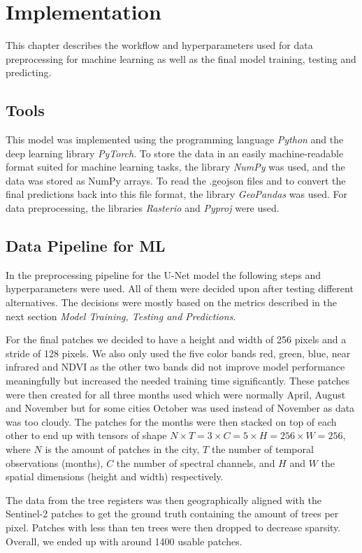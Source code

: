 \section{Implementation}
This chapter describes the workflow and hyperparameters used for data preprocessing for machine learning as well as the final model training, testing and predicting.

\subsection{Tools}
This model was implemented using the programming language \textit{Python} and the deep learning library \textit{PyTorch}. To store the data in an easily machine-readable format suited for machine learning tasks, the library \textit{NumPy} was used, and the data was stored as NumPy arrays. To read the .geojson files and to convert the final predictions back into this file format, the library \textit{GeoPandas} was used. For data preprocessing, the libraries \textit{Rasterio} and \textit{Pyproj} were used. 

\subsection{Data Pipeline for ML}
In the preprocessing pipeline for the U-Net model the following steps and hyperparameters were used. All of them were decided upon after testing different alternatives. The decisions were mostly based on the metrics described in the next section \textit{Model Training, Testing and Predictions}.

For the final patches we decided to have a height and width of 256 pixels and a stride of 128 pixels. We also only used the five color bands red, green, blue, near infrared and NDVI as the other two bands did not improve model performance meaningfully but increased the needed training time significantly. These patches were then created for all three months used which were normally April, August and November but for some cities October was used instead of November as data was too cloudy. The patches for the months were then stacked on top of each other to end up with tensors of shape $N \times T=3 \times C=5 \times H=256 \times W=256$, where $N$ is the amount of patches in the city, $T$ the number of temporal observations (months), $C$ the number of spectral channels, and $H$ and $W$ the spatial dimensions (height and width) respectively.

The data from the tree registers was then geographically aligned with the Sentinel-2 patches to get the ground truth containing the amount of trees per pixel. Patches with less than ten trees were then dropped to decrease sparsity. Overall, we ended up with around 1400 usable patches.

